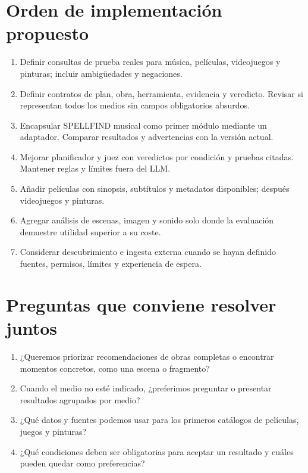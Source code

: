 \documentclass[11pt,a4paper]{article}
\begin{document}
\section{Orden de implementación propuesto}
\begin{enumerate}
\item Definir consultas de prueba reales para música, películas, videojuegos y pinturas; incluir ambigüedades y negaciones.
\item Definir contratos de plan, obra, herramienta, evidencia y veredicto. Revisar si representan todos los medios sin campos obligatorios absurdos.
\item Encapsular SPELLFIND musical como primer módulo mediante un adaptador. Comparar resultados y advertencias con la versión actual.
\item Mejorar planificador y juez con veredictos por condición y pruebas citadas. Mantener reglas y límites fuera del LLM.
\item Añadir películas con sinopsis, subtítulos y metadatos disponibles; después videojuegos y pinturas.
\item Agregar análisis de escenas, imagen y sonido solo donde la evaluación demuestre utilidad superior a su coste.
\item Considerar descubrimiento e ingesta externa cuando se hayan definido fuentes, permisos, límites y experiencia de espera.
\end{enumerate}

\section{Preguntas que conviene resolver juntos}
\begin{enumerate}
\item ¿Queremos priorizar recomendaciones de obras completas o encontrar momentos concretos, como una escena o fragmento?
\item Cuando el medio no esté indicado, ¿preferimos preguntar o presentar resultados agrupados por medio?
\item ¿Qué datos y fuentes podemos usar para los primeros catálogos de películas, juegos y pinturas?
\item ¿Qué condiciones deben ser obligatorias para aceptar un resultado y cuáles pueden quedar como preferencias?
\end{enumerate}
\end{document}

